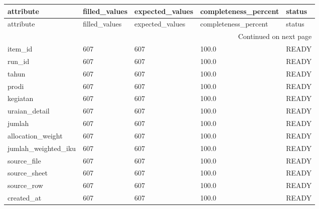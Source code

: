 \begingroup
\scriptsize
\begin{longtable}{lllll}
\toprule
attribute & filled_values & expected_values & completeness_percent & status \\
\midrule
\endfirsthead
\toprule
attribute & filled_values & expected_values & completeness_percent & status \\
\midrule
\endhead
\midrule
\multicolumn{5}{r}{Continued on next page} \\
\midrule
\endfoot
\bottomrule
\endlastfoot
item\_id & 607 & 607 & 100.0 & READY \\
run\_id & 607 & 607 & 100.0 & READY \\
tahun & 607 & 607 & 100.0 & READY \\
prodi & 607 & 607 & 100.0 & READY \\
kegiatan & 607 & 607 & 100.0 & READY \\
uraian\_detail & 607 & 607 & 100.0 & READY \\
jumlah & 607 & 607 & 100.0 & READY \\
allocation\_weight & 607 & 607 & 100.0 & READY \\
jumlah\_weighted\_iku & 607 & 607 & 100.0 & READY \\
source\_file & 607 & 607 & 100.0 & READY \\
source\_sheet & 607 & 607 & 100.0 & READY \\
source\_row & 607 & 607 & 100.0 & READY \\
created\_at & 607 & 607 & 100.0 & READY \\
\end{longtable}
\endgroup
